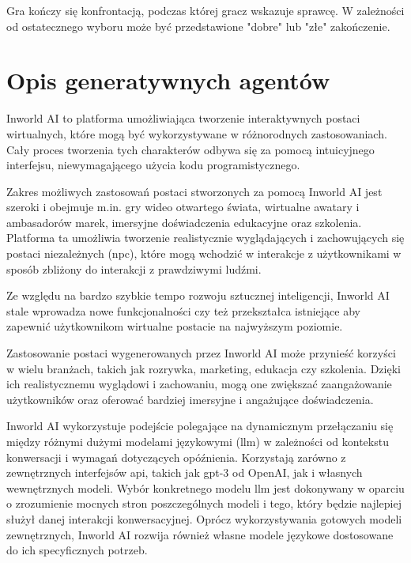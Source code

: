 Gra kończy się konfrontacją, podczas której gracz wskazuje sprawcę.
W zależności od ostatecznego wyboru może być przedstawione "dobre" lub "złe" zakończenie.

\section{Opis generatywnych agentów}\label{section:ch6_2}

Inworld AI to platforma umożliwiająca tworzenie interaktywnych postaci wirtualnych, które mogą być
wykorzystywane w różnorodnych zastosowaniach. Cały proces tworzenia tych charakterów odbywa się za
pomocą intuicyjnego interfejsu, niewymagającego użycia kodu programistycznego.

Zakres możliwych zastosowań postaci stworzonych za pomocą Inworld AI jest szeroki i obejmuje m.in. gry
wideo otwartego świata, wirtualne awatary i ambasadorów marek, imersyjne doświadczenia edukacyjne oraz
szkolenia. Platforma ta umożliwia tworzenie realistycznie wyglądających i zachowujących się postaci
niezależnych (\gls{npc}), które mogą wchodzić w interakcje z użytkownikami w sposób zbliżony do interakcji z
prawdziwymi ludźmi.

Ze względu na bardzo szybkie tempo rozwoju sztucznej inteligencji, Inworld AI stale wprowadza nowe
funkcjonalności czy też przekształca istniejące aby zapewnić użytkownikom wirtualne postacie na
najwyższym poziomie.

Zastosowanie postaci wygenerowanych przez Inworld AI może przynieść korzyści w wielu branżach, takich
jak rozrywka, marketing, edukacja czy szkolenia. Dzięki ich realistycznemu wyglądowi i zachowaniu, mogą
one zwiększać zaangażowanie użytkowników oraz oferować bardziej imersyjne i angażujące doświadczenia.

Inworld AI wykorzystuje podejście polegające na dynamicznym przełączaniu się między różnymi dużymi
modelami językowymi (\gls{llm}) w zależności od kontekstu konwersacji i wymagań dotyczących opóźnienia\cite{inworld_docs}.
Korzystają zarówno z zewnętrznych interfejsów \gls{api}, takich jak \gls{gpt}-3 od OpenAI, jak i własnych
wewnętrznych modeli\cite{inworld_docs}. Wybór konkretnego modelu \gls{llm} jest dokonywany w oparciu o zrozumienie mocnych
stron poszczególnych modeli i tego, który będzie najlepiej służył danej interakcji konwersacyjnej.
Oprócz wykorzystywania gotowych modeli zewnętrznych, Inworld AI rozwija również własne modele
językowe dostosowane do ich specyficznych potrzeb\cite{inworld_docs}.

